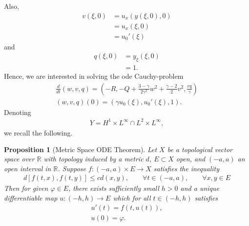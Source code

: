 \documentclass[12pt,reqno]{amsart}
\numberwithin{equation}{section}  %
\numberwithin{figure}{section}
\newcommand{\rr}{\mathbb{R}}
\newcommand{\vp}{\varphi}
\newtheorem{proposition}[theorem]{Proposition}
\begin{document}
Also, 
%
%
\begin{equation*}
\begin{split}
v(\xi, 0)
& = u_{x}(y(\xi, 0), 0)
\\
& = u_{x}(\xi, 0)
\\
& = u_{0}'(\xi)
\end{split}
\end{equation*}
%
%
and
%
%
\begin{equation*}
\begin{split}
q(\xi,0)
& = y_{\xi}(\xi, 0)
\\
& = 1.
\end{split}
\end{equation*}
%
%
Hence, we are interested in solving the ode Cauchy-problem
%
%
%
%
\begin{gather}
\label{ode-system}
\frac{d}{dt}(w, v, q) = \left ( -R, -Q + \frac{3 - \gamma}{2 \gamma^{2}}w^{2} + \frac{\gamma -2}{2}v^{2}, \frac{vq}{\gamma} \right ) 
\\
\label{ode-system-init}
(w, v, q)(0) = (\gamma u_{0}(\xi), u_{0}'(\xi), 1).
\end{gather}
%
Denoting
%
%
\begin{equation*}
\begin{split}
  Y = H^{1} \times L^{\infty} \cap L^{2} \times L^{\infty},
\end{split}
\end{equation*}
%
%
we recall the following.
%
\begin{proposition}[Metric Space ODE Theorem]
	\label{prop:ode-thm}
  Let $X$ be a topological vector space over $\rr$
  with topology induced by a metric $d$, $E \subset X$ open, and $(-a, a)$ an
	open interval in $\rr$. Suppose $f: (-a, a) \times E \to X$ satisfies the
	inequality
	\begin{equation}
		\label{stronger-ode}
		\begin{split}
      d[f(t, x), f(t, y)] \le c d(x, y), \qquad \forall t \in (-a, a),
			\qquad \forall x, y \in E
		\end{split}
	\end{equation}
  Then for given $\vp \in E$, there exists sufficiently small $h > 0$ and a
  unique differentiable map $u: (-h, h) \to E$ which for all $t \in (-h, h)$
  satisfies 
	\begin{gather}
    \label{ode-thm-eq}
			u'(t) = f(t, u(t)),
			\\
      \label{ode-thm-init-data}
			u(0) = \vp.
	\end{gather}
\end{proposition}
\end{document}
